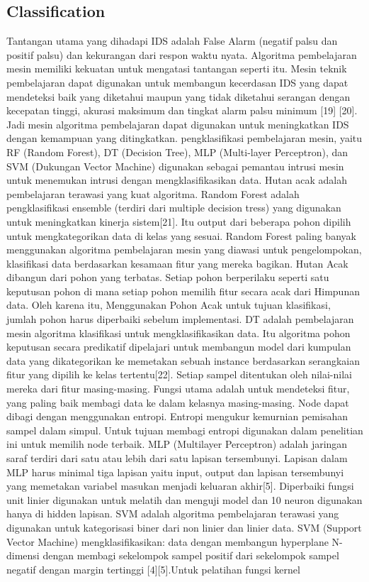 \documentclass[conference]{IEEEtran}
\begin{document}
\subsection{Classification}
Tantangan utama yang dihadapi IDS adalah False Alarm (negatif palsu dan positif palsu) dan kekurangan dari respon waktu nyata. Algoritma pembelajaran mesin memiliki kekuatan untuk mengatasi tantangan seperti itu. Mesin teknik pembelajaran dapat digunakan untuk membangun kecerdasan IDS yang dapat mendeteksi baik yang diketahui maupun yang tidak diketahui serangan dengan kecepatan tinggi, akurasi maksimum dan tingkat alarm palsu minimum [19]\cite{masoodi2019symmetric} [20]\cite{jabbar2017rfaode}. Jadi mesin algoritma pembelajaran dapat digunakan untuk meningkatkan IDS dengan kemampuan yang ditingkatkan. pengklasifikasi pembelajaran mesin, yaitu RF (Random Forest), DT (Decision Tree), MLP (Multi-layer Perceptron), dan SVM (Dukungan Vector Machine) digunakan sebagai pemantau intrusi mesin untuk menemukan intrusi dengan mengklasifikasikan data. Hutan acak adalah pembelajaran terawasi yang kuat algoritma. Random Forest adalah pengklasifikasi ensemble (terdiri dari multiple decision tress) yang digunakan untuk meningkatkan kinerja sistem[21]\cite{rutkowski2012decision}. Itu output dari beberapa pohon dipilih untuk mengkategorikan data di kelas yang sesuai. Random Forest paling banyak menggunakan algoritma pembelajaran mesin yang diawasi untuk pengelompokan, klasifikasi data berdasarkan kesamaan fitur yang mereka bagikan. Hutan Acak dibangun dari pohon yang terbatas. Setiap pohon berperilaku seperti satu keputusan pohon di mana setiap pohon memilih fitur secara acak dari Himpunan data. Oleh karena itu, Menggunakan Pohon Acak untuk tujuan klasifikasi, jumlah pohon harus diperbaiki sebelum implementasi. DT adalah pembelajaran mesin algoritma klasifikasi untuk mengklasifikasikan data. Itu algoritma pohon keputusan secara predikatif dipelajari untuk membangun model dari kumpulan data yang dikategorikan ke memetakan sebuah instance berdasarkan serangkaian fitur yang dipilih ke kelas tertentu[22]\cite{alsmadi2017sdn}. Setiap sampel ditentukan oleh nilai-nilai mereka dari fitur masing-masing. Fungsi utama adalah untuk mendeteksi fitur, yang paling baik membagi data ke dalam kelasnya masing-masing. Node dapat dibagi dengan menggunakan entropi. Entropi mengukur kemurnian pemisahan sampel dalam simpul. Untuk tujuan membagi entropi digunakan dalam penelitian ini untuk memilih node terbaik. MLP (Multilayer Perceptron) adalah jaringan saraf terdiri dari satu atau lebih dari satu lapisan tersembunyi. Lapisan dalam MLP harus minimal tiga lapisan yaitu input, output dan lapisan tersembunyi yang memetakan variabel masukan menjadi keluaran akhir[5]\cite{sain1996nature}. Diperbaiki fungsi unit linier digunakan untuk melatih dan menguji model dan 10 neuron digunakan hanya di hidden lapisan. SVM adalah algoritma pembelajaran terawasi yang digunakan untuk kategorisasi biner dari non linier dan linier data. SVM (Support Vector Machine) mengklasifikasikan: data dengan membangun hyperplane N-dimensi dengan membagi sekelompok sampel positif dari sekelompok sampel negatif dengan margin tertinggi [4]\cite{yang2015evaluating}[5]\cite{sain1996nature}.Untuk pelatihan fungsi kernel 
\end{document}
